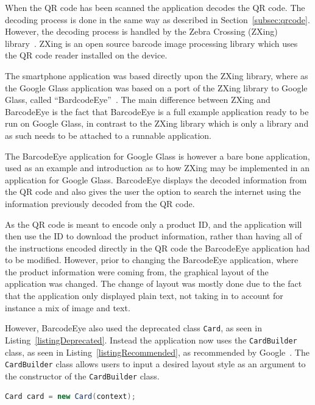 When the QR code has been scanned the application decodes the QR code. The decoding process is done in the same way as described in Section~\ref{subsec:qrcode}. However, the decoding process is handled by the Zebra Crossing (ZXing) library~\cite{zxing}. ZXing is an open source barcode image processing library which uses the QR code reader installed on the device.

The smartphone application was based directly upon the ZXing library, where as the Google Glass application was based on a port of the ZXing library to Google Glass, called ``BardcodeEye''~\cite{barcodeEye}. The main difference between ZXing and BarcodeEye is the fact that BarcodeEye is a full example application ready to be run on Google Glass, in contrast to the ZXing library which is only a library and as such needs to be attached to a runnable application.

The BarcodeEye application for Google Glass is however a bare bone application, used as an example and introduction as to how ZXing may be implemented in an application for Google Glass. BarcodeEye displays the decoded information from the QR code and also gives the user the option to search the internet using the information previously decoded from the QR code.

As the QR code is meant to encode only a product ID, and the application will then use the ID to download the product information, rather than having all of the instructions encoded directly in the QR code the BarcodeEye application had to be modified. However, prior to changing the BarcodeEye application, where the product information were coming from, the graphical layout of the application was changed. The change of layout was mostly done due to the fact that the application only displayed plain text, not taking in to account for instance a mix of image and text.

However, BarcodeEye also used the deprecated class \texttt{Card}, as seen in Listing~\ref{listingDeprecated}. Instead the application now uses the \texttt{CardBuilder} class, as seen in Listing~\ref{listingRecommended}, as recommended by Google~\cite{googleCard}. The \texttt{CardBuilder} class allows users to input a desired layout style as an argument to the constructor of the \texttt{CardBuilder} class.

\begin{lstlisting}[language=Java, caption={Instancing of the deprecated class Card}, label=listingDeprecated]
Card card = new Card(context);
\end{lstlisting}

